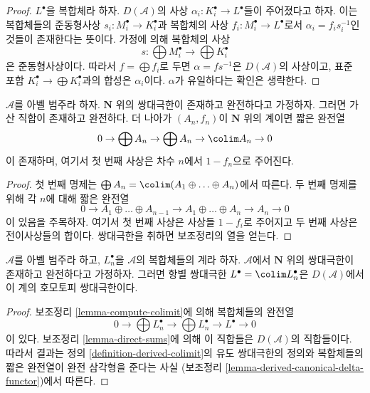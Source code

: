 \begin{proof}
$L^\bullet$을 복합체라 하자. $D(\mathcal{A})$의 사상
$\alpha_i : K_i^\bullet \to L^\bullet$들이 주어졌다고 하자.
이는 복합체들의 준동형사상 $s_i : M_i^\bullet \to K_i^\bullet$과
복합체의 사상 $f_i : M_i^\bullet \to L^\bullet$로서
$\alpha_i = f_is_i^{-1}$인 것들이 존재한다는 뜻이다. 가정에 의해
복합체의 사상
$$
s : \bigoplus M_i^\bullet \longrightarrow \bigoplus K_i^\bullet
$$
은 준동형사상이다. 따라서 $f = \bigoplus f_i$로 두면
$\alpha = fs^{-1}$은 $D(\mathcal{A})$의 사상이고, 표준 포함
$K_i^\bullet \to \bigoplus K_i^\bullet$과의 합성은 $\alpha_i$이다.
$\alpha$가 유일하다는 확인은 생략한다.
\end{proof}

\begin{lemma}
\label{lemma-compute-colimit}
$\mathcal{A}$를 아벨 범주라 하자. $\mathbf{N}$ 위의 쌍대극한이
존재하고 완전하다고 가정하자. 그러면 가산 직합이 존재하고 완전하다.
더 나아가 $(A_n, f_n)$이 $\mathbf{N}$ 위의 계이면 짧은 완전열
$$
0 \to \bigoplus A_n \to \bigoplus A_n \to \colim A_n \to 0
$$
이 존재하며, 여기서 첫 번째 사상은 차수 $n$에서 $1 - f_n$으로
주어진다.
\end{lemma}

\begin{proof}
첫 번째 명제는
$\bigoplus A_n = \colim (A_1 \oplus \ldots \oplus A_n)$에서 따른다.
두 번째 명제를 위해 각 $n$에 대해 짧은 완전열
$$
0 \to
A_1 \oplus \ldots \oplus A_{n - 1} \to
A_1 \oplus \ldots \oplus A_n \to A_n \to 0
$$
이 있음을 주목하자. 여기서 첫 번째 사상은 사상들 $1 - f_i$로
주어지고 두 번째 사상은 전이사상들의 합이다. 쌍대극한을 취하면
보조정리의 열을 얻는다.
\end{proof}

\begin{lemma}
\label{lemma-colim-hocolim}
$\mathcal{A}$를 아벨 범주라 하고, $L_n^\bullet$을 $\mathcal{A}$의
복합체들의 계라 하자. $\mathcal{A}$에서 $\mathbf{N}$ 위의
쌍대극한이 존재하고 완전하다고 가정하자. 그러면 항별 쌍대극한
$L^\bullet = \colim L_n^\bullet$은 $D(\mathcal{A})$에서 이 계의
호모토피 쌍대극한이다.
\end{lemma}

\begin{proof}
보조정리 \ref{lemma-compute-colimit}에 의해 복합체들의 완전열
$$
0 \to \bigoplus L_n^\bullet \to \bigoplus L_n^\bullet \to L^\bullet \to 0
$$
이 있다. 보조정리 \ref{lemma-direct-sums}에 의해 이 직합들은
$D(\mathcal{A})$의 직합들이다. 따라서 결과는
정의 \ref{definition-derived-colimit}의 유도 쌍대극한의 정의와
복합체들의 짧은 완전열이 완전 삼각형을 준다는 사실
(보조정리 \ref{lemma-derived-canonical-delta-functor})에서 따른다.
\end{proof}


